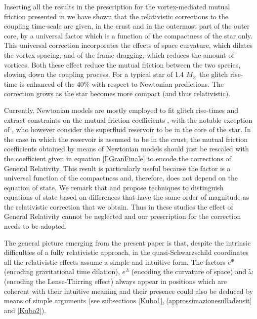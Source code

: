 \documentclass[usenatbib%
]{mnras}
\begin{document}
Inserting all the results in the prescription for the vortex-mediated mutual friction presented in \cite{langlois98} we have shown that the relativistic corrections to the coupling time-scale are given, in the crust and in the outermost part of the outer core, by a universal factor which is a function of the compactness of the star only. 
This universal correction incorporates the effects of space curvature, which dilates the vortex spacing, and of the frame dragging, which reduces the amount of vortices. 
Both these effect reduce the mutual friction between the two species, slowing down the coupling process. For a typical star of 1.4 $M_\odot$ the glitch rise-time is enhanced of the $40\%$ with respect to Newtonian predictions. The correction grows as the star becomes more compact (and thus relativistic). 

Currently, Newtonian models are mostly employed to fit glitch rise-times and extract constraints on the mutual friction coefficients \citep{Haskell2018Crab, ashton2019rotational, pizzochero2019core}, with the notable exception of \citep{sourie_glitch2017}, who however consider the superfluid reservoir to be in the core of the star. 
In the case in which the reservoir is assumed to be in the crust, the mutual friction coefficients obtained by means of Newtonian models should just be rescaled with the coefficient given in equation \eqref{IlGranFinale} to encode the corrections of General Relativity. 
This result is particularly useful because the factor is a universal function of the compactness and, therefore, does not depend on the equation of state. We remark that \cite{Ho_2015} and \cite{NewtonBergerHaskell2015} propose techniques to distinguish equations of state based on differences that have the same order of magnitude as the relativistic correction that we obtain. Thus in these studies the effect of General Relativity cannot be neglected and our prescription for the correction needs to be adopted.

The general picture emerging from the present paper is that, despite the intrinsic difficulties of a fully relativistic approach, in the quasi-Schwarzschild coordinates all the relativistic effects assume a simple and intuitive form. 
The factors $e^\Phi$ (encoding gravitational time dilation), $e^\Lambda$ (encoding the curvature of space) and $\tilde{\omega}$ (encoding the Lense-Thirring effect) always appear in positions which are coherent with their intuitive meaning and their presence could also be deduced by means of simple arguments (see subsections \ref{Kubo1}, \ref{approssimazionesulladensit} and \ref{Kubo2}). 
\end{document}
